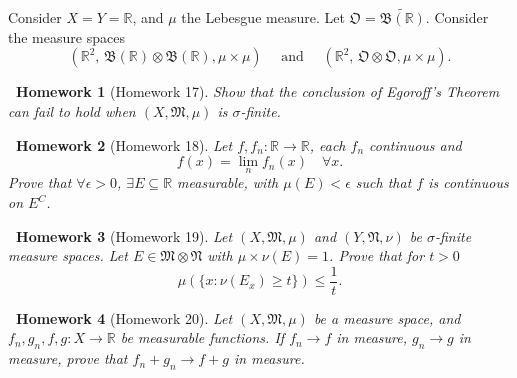 \documentclass[notoc,notitlepage]{tufte-book}
\newtheorem*{homework}{\faCogs\ Homework}
\begin{document}
\begin{eg}

  Consider $X = Y = \mathbb{R}$, and $\mu$ the Lebesgue measure.
  Let $\mathfrak{O} = \widetilde{\mathfrak{B}(\mathbb{R})}$.
  Consider the measure spaces
  \begin{equation*}
    (\mathbb{R}^2,\, \mathfrak{B}(\mathbb{R}) \otimes \mathfrak{B}(\mathbb{R}),
    \mu \times \mu)
    \quad\text{ and }\quad
    (\mathbb{R}^2,\, \mathfrak{O} \otimes \mathfrak{O}, \mu \times \mu).
  \end{equation*}
\end{eg}

\begin{homework}[Homework 17]\label{homework:17}
	Show that the conclusion of Egoroff's Theorem
  can fail to hold when $(X, \mathfrak{M}, \mu)$ is $\sigma$-finite.
\end{homework}

\begin{homework}[Homework 18]\label{homework:18}
  Let $f, f_n : \mathbb{R} \to \mathbb{R}$,
  each $f_n$ continuous and
  \begin{equation*}
    f(x) = \lim_{n} f_n(x) \quad \forall x.
  \end{equation*}
  Prove that $\forall \epsilon > 0$,
  $\exists E \subseteq \mathbb{R}$ measurable,
  with $\mu(E) < \epsilon$ such that $f$ is continuous on $E^C$.
\end{homework}

\begin{homework}[Homework 19]\label{homework:19}
  Let $(X, \mathfrak{M}, \mu)$ and $(Y, \mathfrak{N}, \nu)$ be
  $\sigma$-finite measure spaces.
  Let $E \in \mathfrak{M} \otimes \mathfrak{N}$
  with $\mu \times \nu(E) = 1$.
  Prove that for $t > 0$
  \begin{equation*}
    \mu(\{ x : \nu(E_x) \geq t \}) \leq \frac{1}{t}.
  \end{equation*}
\end{homework}

\begin{homework}[Homework 20]\label{homework:homework_20}
  Let $(X, \mathfrak{M}, \mu)$ be a measure space, and
  $f_n, g_n, f, g : X \to \mathbb{R}$ be measurable functions.
  If $f_n \to f$ in measure, $g_n \to g$ in measure,
  prove that $f_n + g_n \to f + g$ in measure.
\end{homework}
\end{document}
